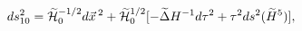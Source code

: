 \begin{equation}
ds_{10}^2 = \widetilde{\cal H}_0^{-1/2}d\vec x\,^2
+\widetilde{\cal H}_0^{1/2}[-\widetilde\Delta
H^{-1}d\tau^2+\tau^2ds^2(\widetilde H^5)],
\label{eq:bhten2}
\end{equation}

